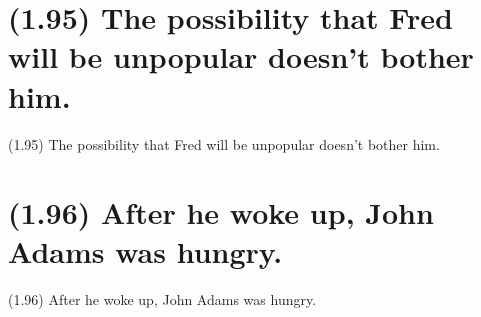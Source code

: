 \documentclass{article}
\begin{document}
\clearpage

%
%

\section*{(1.95) The possibility that Fred will be unpopular doesn’t bother him.}

\bigbreak
\begin{enumerate*}
\item[(1.95)] The possibility that Fred will be unpopular doesn’t bother him.
\end{enumerate*}
\bigbreak

\bigbreak
\begin{minipage}{\textwidth}
\end{minipage}
\bigbreak

\clearpage

%
%

\section*{(1.96) After he woke up, John Adams was hungry.}

\bigbreak
\begin{enumerate*}
\item[(1.96)] After he woke up, John Adams was hungry.
\end{enumerate*}
\bigbreak

\bigbreak
\begin{minipage}{\textwidth}
\end{minipage}
\bigbreak
\end{document}
